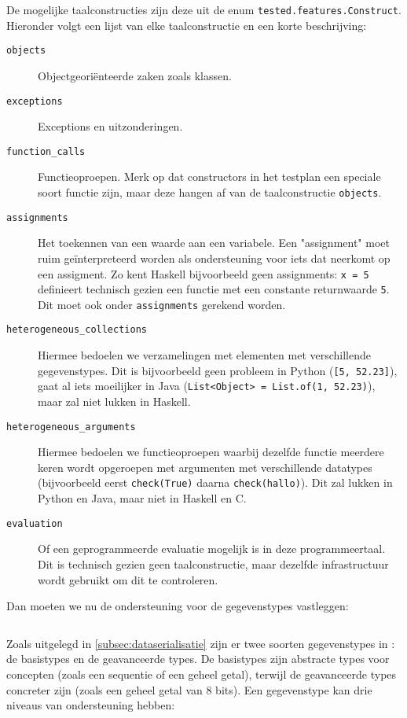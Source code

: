 De mogelijke taalconstructies zijn deze uit de enum \texttt{tested.features.Construct}.
Hieronder volgt een lijst van elke taalconstructie en een korte beschrijving:

\begin{description}
    \item[\texttt{objects}] Objectgeoriënteerde zaken zoals klassen.
    \item[\texttt{exceptions}] Exceptions en uitzonderingen.
    \item[\texttt{function\_calls}] Functieoproepen.
    Merk op dat constructors in het testplan een speciale soort functie zijn, maar deze hangen af van de taalconstructie \texttt{objects}.
    \item[\texttt{assignments}] Het toekennen van een waarde aan een variabele.
    Een "assignment" moet ruim geïnterpreteerd worden als ondersteuning voor iets dat neerkomt op een assigment.
    Zo kent Haskell bijvoorbeeld geen assignments: \texttt{x = 5} definieert technisch gezien een functie met een constante returnwaarde \texttt{5}.
    Dit moet ook onder \texttt{assignments} gerekend worden.
    \item[\texttt{heterogeneous\_collections}] Hiermee bedoelen we verzamelingen met elementen met verschillende gegevenstypes.
    Dit is bijvoorbeeld geen probleem in Python (\texttt{[5, 52.23]}), gaat al iets moeilijker in Java (\texttt{List<Object> = List.of(1, 52.23)}), maar zal niet lukken in Haskell.
    \item[\texttt{heterogeneous\_arguments}] Hiermee bedoelen we functieoproepen waarbij dezelfde functie meerdere keren wordt opgeroepen met argumenten met verschillende datatypes (bijvoorbeeld eerst \texttt{check(True)} daarna \texttt{check(\textquotesingle{}hallo\textquotesingle{})}).
    Dit zal lukken in Python en Java, maar niet in Haskell en C\@.
    \item[\texttt{evaluation}] Of een geprogrammeerde evaluatie mogelijk is in deze programmeertaal.
    Dit is technisch gezien geen taalconstructie, maar dezelfde infrastructuur wordt gebruikt om dit te controleren.
\end{description}

Dan moeten we nu de ondersteuning voor de gegevenstypes vastleggen:

\inputminted[firstline=28,lastline=54,gobble=2]{js}{sources/c-config.json}

Zoals uitgelegd in \cref{subsec:dataserialisatie} zijn er twee soorten gegevenstypes in \tested{}: de basistypes en de geavanceerde types.
De basistypes zijn abstracte types voor concepten (zoals een sequentie of een geheel getal), terwijl de geavanceerde types concreter zijn (zoals een geheel getal van 8 bits).
Een gegevenstype kan drie niveaus van ondersteuning hebben:

